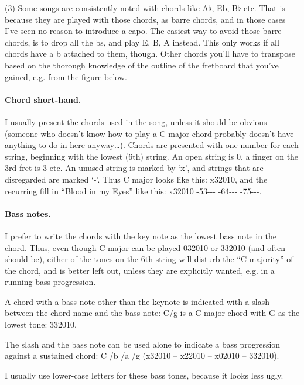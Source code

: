 (3) Some songs are consistently noted with chords like A$\flat$, Eb,
B$\flat$ etc. That is because they are played with those chords, as
barre chords, and in those cases I've seen no reason to introduce a
capo. The easiest way to avoid those barre chords, is to drop all the
bs, and play E, B, A instead. This only works if all chords have a b
attached to them, though. Other chords you'll have to transpose based
on the thorough knowledge of the outline of the fretboard that you've
gained, e.g. from the figure below.

\paragraph*{Chord short-hand.} I usually present the chords used in
the song, unless it should be obvious (someone who doesn't know how to
play a C major chord probably doesn't have anything to do in here
anyway\ldots{}). Chords are presented with one number for each string,
beginning with the lowest (6th) string. An open string is 0, a finger
on the 3rd fret is 3 etc. An unused string is marked by `{}x'{}, and
strings that are disregarded are marked `{}-'{}. Thus C major looks
like this: x32010, and the recurring fill in ``{}Blood in my Eyes''{}
like this: x32010 -53{-}-{-} -64{-}-{-} -75{-}-{-}.

\paragraph*{Bass notes.} I prefer to write the chords with the key
note as the lowest bass note in the chord. Thus, even though C major
can be played 032010 or 332010 (and often should be), either of the
tones on the 6th string will disturb the ``{}C-majority''{} of the
chord, and is better left out, unless they are explicitly wanted,
e.g. in a running bass progression.

A chord with a bass note other than the keynote is indicated with a
slash between the chord name and the bass note: C/g is a C major chord
with G as the lowest tone: 332010.

The slash and the bass note can be used alone to indicate a bass
progression against a sustained chord: C /b /a /g (x32010 -- x22010 -- x02010 -- 332010).

I usually use lower-case letters for these bass tones, because it
looks less ugly.

